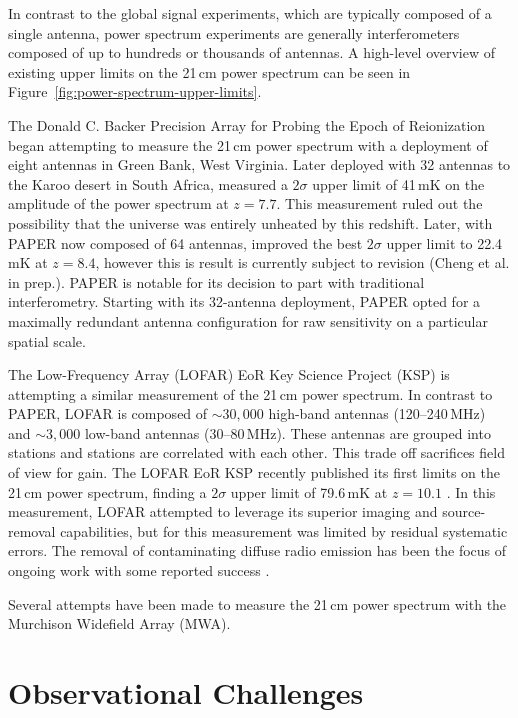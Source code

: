 \begin{bibunit}
In contrast to the global signal experiments, which are typically composed of a single antenna,
power spectrum experiments are generally interferometers composed of up to hundreds or thousands of
antennas. A high-level overview of existing upper limits on the 21\,cm power spectrum can be seen in
Figure~\ref{fig:power-spectrum-upper-limits}.


The Donald C. Backer Precision Array for Probing the Epoch of Reionization
\citep[PAPER;][]{2010AJ....139.1468P} began attempting to measure the 21\,cm power spectrum with a
deployment of eight antennas in Green Bank, West Virginia. Later deployed with 32 antennas to the
Karoo desert in South Africa, \citet{2014ApJ...788..106P} measured a $2\sigma$ upper limit of 41\,mK
on the amplitude of the power spectrum at $z=7.7$. This measurement ruled out the possibility that
the universe was entirely unheated by this redshift.  Later, with PAPER now composed of 64 antennas,
\citet{2015ApJ...809...61A} improved the best $2\sigma$ upper limit to 22.4\,mK at $z=8.4$, however
this is result is currently subject to revision (Cheng et al. in prep.). PAPER is notable for its
decision to part with traditional interferometry. Starting with its 32-antenna deployment, PAPER
opted for a maximally redundant antenna configuration for raw sensitivity on a particular spatial
scale.

The Low-Frequency Array (LOFAR) EoR Key Science Project (KSP) is attempting a similar measurement of
the 21\,cm power spectrum. In contrast to PAPER, LOFAR is composed of $\sim30,000$ high-band
antennas (120--240\,MHz) and $\sim3,000$ low-band antennas (30--80\,MHz). These antennas are grouped
into stations and stations are correlated with each other. This trade off sacrifices field of view
for gain. The LOFAR EoR KSP recently published its first limits on the 21\,cm power spectrum,
finding a $2\sigma$ upper limit of 79.6\,mK at $z=10.1$ \citep{2017ApJ...838...65P}. In this
measurement, LOFAR attempted to leverage its superior imaging and source-removal capabilities, but
for this measurement was limited by residual systematic errors. The removal of contaminating diffuse
radio emission has been the focus of ongoing work with some reported success \citep{koopmans_2017}.

Several attempts have been made to measure the 21\,cm power spectrum with the Murchison Widefield
Array (MWA).



\section{Observational Challenges}


\end{bibunit}
